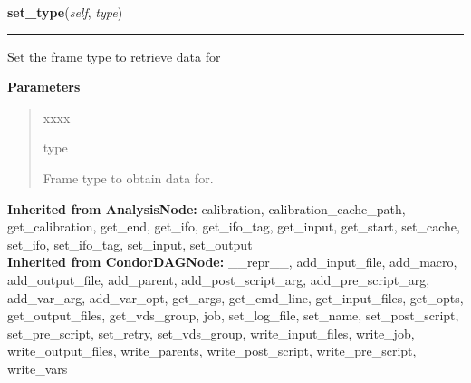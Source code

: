     \label{stochastic:LSCDataFindNode:set_type}
    \vspace{0.5ex}

    \begin{boxedminipage}{\textwidth}

    \raggedright \textbf{set\_type}(\textit{self}, \textit{type})

    \vspace{-1.5ex}

    \rule{\textwidth}{0.5\fboxrule}
    Set the frame type to retrieve data for

    \vspace{1ex}

      \textbf{Parameters}
      \begin{quote}
        \begin{Ventry}{xxxx}

          \item[type]

          Frame type to obtain data for.

        \end{Ventry}

      \end{quote}

    \vspace{1ex}

    \end{boxedminipage}

  \textbf{Inherited from AnalysisNode:}
    calibration,
    calibration\_cache\_path,
    get\_calibration,
    get\_end,
    get\_ifo,
    get\_ifo\_tag,
    get\_input,
    get\_start,
    set\_cache,
    set\_ifo,
    set\_ifo\_tag,
    set\_input,
    set\_output
    \\
  \textbf{Inherited from CondorDAGNode:}
    \_\_repr\_\_,
    add\_input\_file,
    add\_macro,
    add\_output\_file,
    add\_parent,
    add\_post\_script\_arg,
    add\_pre\_script\_arg,
    add\_var\_arg,
    add\_var\_opt,
    get\_args,
    get\_cmd\_line,
    get\_input\_files,
    get\_opts,
    get\_output\_files,
    get\_vds\_group,
    job,
    set\_log\_file,
    set\_name,
    set\_post\_script,
    set\_pre\_script,
    set\_retry,
    set\_vds\_group,
    write\_input\_files,
    write\_job,
    write\_output\_files,
    write\_parents,
    write\_post\_script,
    write\_pre\_script,
    write\_vars

